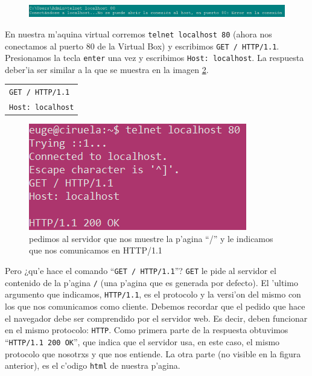 \documentclass[11pt]{article}
\begin{document}
		\begin{figure}[H]
    			\centering
    			\includegraphics[scale=0.358]{Images/Apache/fig__.png}
    			\label{fig:__}
		\end{figure}

		En nuestra m'aquina virtual corremos \texttt{telnet localhost 80} (ahora nos conectamos al puerto 80 de la Virtual Box) y escribimos \texttt{GET / HTTP/1.1}. Presionamos la tecla \texttt{enter} una vez y escribimos \texttt{Host: localhost}. La respuesta deber'ia ser similar a la que se muestra en la imagen \ref{fig:4}.

		\begin{table}[H]
    			\centering
    			\begin{tabular}{|l|}
        			\hline
        			\texttt{GET / HTTP/1.1} \\
        			\texttt{Host: localhost} \\\hline
    			\end{tabular}
    			\label{tab:my_label}
		\end{table}

		\begin{figure}[H]
    			\centering
    			\includegraphics[scale=0.6]{Images/Apache/fig4_.png}
    			\caption{pedimos al servidor que nos muestre la p'agina ``/'' y le indicamos que nos comunicamos en HTTP/1.1}
    			\label{fig:4}
		\end{figure}

		Pero ¿qu'e hace el comando ``\texttt{GET / HTTP/1.1}''? \texttt{GET} le pide al servidor el contenido de la p'agina \texttt{/} (una p'agina que es generada por defecto). El 'ultimo argumento que indicamos, \texttt{HTTP/1.1}, es el protocolo y la versi'on del mismo con los que nos comunicamos como cliente. 
Debemos recordar que el pedido que hace el navegador debe ser comprendido por el servidor web. Es decir, deben funcionar en el mismo protocolo: \texttt{HTTP}.
Como primera parte de la respuesta obtuvimos ``\texttt{HTTP/1.1 200 OK}'', que indica que el servidor usa, en este caso, el mismo protocolo que nosotrxs y que nos entiende. La otra parte (no visible en la figura anterior), es el c'odigo \texttt{html} de nuestra p'agina.
\end{document}
